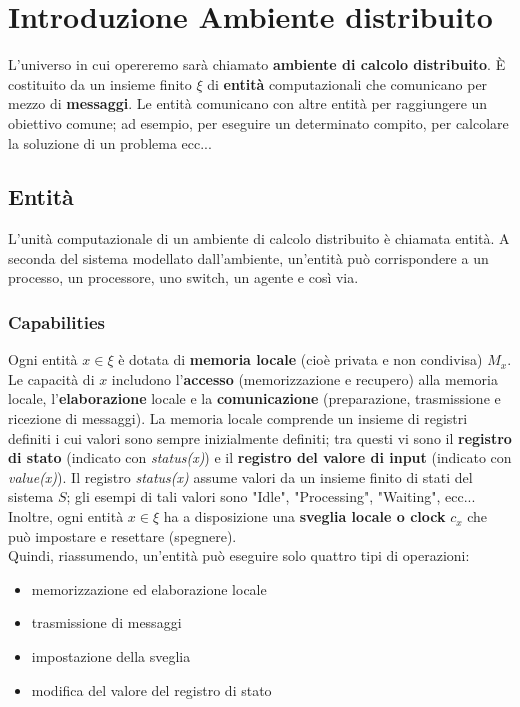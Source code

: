 \chapter{Introduzione Ambiente distribuito}

L'universo in cui opereremo sarà chiamato \textbf{ambiente di calcolo
    distribuito}. È costituito da un insieme finito $\xi$ di \textbf{entità}
computazionali che comunicano per mezzo di \textbf{messaggi}. Le entità
comunicano con altre entità per raggiungere un obiettivo comune; ad esempio,
per eseguire un determinato compito, per calcolare la soluzione di un problema
ecc...

\section{Entità}
L'unità computazionale di un ambiente di calcolo distribuito è chiamata entità.
A seconda del sistema modellato dall'ambiente, un'entità può corrispondere a un
processo, un processore, uno switch, un agente e così via.

\subsection{Capabilities}
Ogni entità $x \in \xi$ è dotata di \textbf{memoria locale} (cioè privata e non
condivisa) $M_x$. Le capacità di $x$ includono l'\textbf{accesso}
(memorizzazione e recupero) alla memoria locale, l'\textbf{elaborazione} locale
e la \textbf{comunicazione} (preparazione, trasmissione e ricezione di
messaggi). La memoria locale comprende un insieme di registri definiti i cui
valori sono sempre inizialmente definiti; tra questi vi sono il \textbf{registro
    di stato} (indicato con \textit{status(x)}) e il \textbf{registro del valore di
    input} (indicato con \textit{value(x)}). Il registro \textit{status(x)} assume
valori da un insieme finito di stati del sistema $S$; gli esempi di tali valori
sono "Idle", "Processing", "Waiting", ecc...\\
Inoltre, ogni entità $x \in \xi$ ha a disposizione una \textbf{sveglia locale o
    clock} $c_x$ che può impostare e resettare (spegnere).\\
Quindi, riassumendo, un'entità può eseguire solo quattro tipi di operazioni:

\begin{itemize}
    \item memorizzazione ed elaborazione locale
    \item trasmissione di messaggi
    \item impostazione della sveglia
    \item modifica del valore del registro di stato
\end{itemize}

